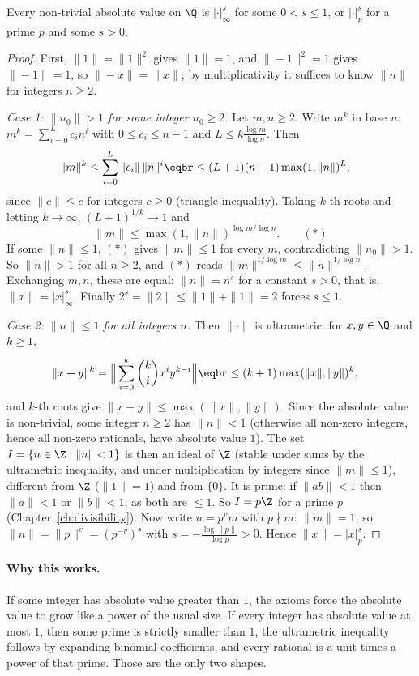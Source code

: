 \begin{theorem}[Ostrowski, 1916]\label{thm:ostrowski}
Every non-trivial absolute value on $\Q$ is $|\cdot|_\infty^s$ for some $0<s\le1$, or $|\cdot|_p^s$ for a prime $p$ and some $s>0$.
\end{theorem}
\begin{proof}
First, $\|1\|=\|1\|^2$ gives $\|1\|=1$, and $\|-1\|^2=1$ gives $\|-1\|=1$, so $\|-x\|=\|x\|$; by multiplicativity it suffices to know $\|n\|$ for integers $n\ge2$.

\emph{Case 1: $\|n_0\|>1$ for some integer $n_0\ge2$.} Let $m,n\ge2$. Write $m^k$ in base $n$: $m^k=\sum_{i=0}^Lc_in^i$ with $0\le c_i\le n-1$ and $L\le k\frac{\log m}{\log n}$. Then
\[
\begin{aligned}&\|m\|^k\le\sum_{i=0}^L\|c_i\|\,\|n\|^i\eqbr\le(L+1)(n-1)\max(1,\|n\|)^L,\end{aligned}
\]
since $\|c\|\le c$ for integers $c\ge0$ (triangle inequality). Taking $k$-th roots and letting $k\to\infty$, $(L+1)^{1/k}\to1$ and
\[
\|m\|\le\max(1,\|n\|)^{\log m/\log n}.\qquad(\ast)
\]
If some $\|n\|\le1$, $(\ast)$ gives $\|m\|\le1$ for every $m$, contradicting $\|n_0\|>1$. So $\|n\|>1$ for all $n\ge2$, and $(\ast)$ reads $\|m\|^{1/\log m}\le\|n\|^{1/\log n}$. Exchanging $m,n$, these are equal: $\|n\|=n^s$ for a constant $s>0$, that is, $\|x\|=|x|_\infty^s$. Finally $2^s=\|2\|\le\|1\|+\|1\|=2$ forces $s\le1$.

\emph{Case 2: $\|n\|\le1$ for all integers $n$.} Then $\|\cdot\|$ is ultrametric: for $x,y\in\Q$ and $k\ge1$,
\[
\begin{aligned}\|x+y\|^k&=\Big\|\sum_{i=0}^k\binom kix^iy^{k-i}\Big\|\eqbr\le(k+1)\max(\|x\|,\|y\|)^k,\end{aligned}
\]
and $k$-th roots give $\|x+y\|\le\max(\|x\|,\|y\|)$. Since the absolute value is non-trivial, some integer $n\ge2$ has $\|n\|<1$ (otherwise all non-zero integers, hence all non-zero rationals, have absolute value $1$). The set $I=\{n\in\Z:\|n\|<1\}$ is then an ideal of $\Z$ (stable under sums by the ultrametric inequality, and under multiplication by integers since $\|m\|\le1$), different from $\Z$ ($\|1\|=1$) and from $\{0\}$. It is prime: if $\|ab\|<1$ then $\|a\|<1$ or $\|b\|<1$, as both are $\le1$. So $I=p\Z$ for a prime $p$ (Chapter~\ref{ch:divisibility}). Now write $n=p^vm$ with $p\nmid m$: $\|m\|=1$, so $\|n\|=\|p\|^v=(p^{-v})^s$ with $s=-\frac{\log\|p\|}{\log p}>0$. Hence $\|x\|=|x|_p^s$.
\end{proof}

\paragraph{Why this works.}
If some integer has absolute value greater than $1$, the axioms force the absolute value to grow like a power of the usual size. If every integer has absolute value at most $1$, then some prime is strictly smaller than $1$, the ultrametric inequality follows by expanding binomial coefficients, and every rational is a unit times a power of that prime. Those are the only two shapes.

